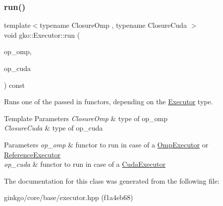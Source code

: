 \subsubsection{\texorpdfstring{run()}{run()}\hspace{0.1cm}{\footnotesize\ttfamily [2/2]}}
{\footnotesize\ttfamily template$<$typename Closure\+Omp , typename Closure\+Cuda $>$ \\
void gko\+::\+Executor\+::run (\begin{DoxyParamCaption}\item[{const Closure\+Omp \&}]{op\+\_\+omp,  }\item[{const Closure\+Cuda \&}]{op\+\_\+cuda }\end{DoxyParamCaption}) const\hspace{0.3cm}{\ttfamily [inline]}}



Runs one of the passed in functors, depending on the \hyperlink{classgko_1_1Executor}{Executor} type. 


\begin{DoxyTemplParams}{Template Parameters}
{\em Closure\+Omp} & type of op\+\_\+omp \\
\hline
{\em Closure\+Cuda} & type of op\+\_\+cuda\\
\hline
\end{DoxyTemplParams}

\begin{DoxyParams}{Parameters}
{\em op\+\_\+omp} & functor to run in case of a \hyperlink{classgko_1_1OmpExecutor}{Omp\+Executor} or \hyperlink{classgko_1_1ReferenceExecutor}{Reference\+Executor} \\
\hline
{\em op\+\_\+cuda} & functor to run in case of a \hyperlink{classgko_1_1CudaExecutor}{Cuda\+Executor} \\
\hline
\end{DoxyParams}


The documentation for this class was generated from the following file\+:\begin{DoxyCompactItemize}
\item 
ginkgo/core/base/executor.\+hpp (f1a4eb68)\end{DoxyCompactItemize}
